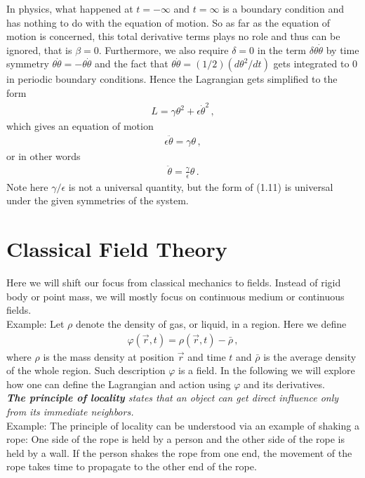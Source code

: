\documentclass[11pt, onesided]{book}
\theoremstyle{break}
\theoremstyle{break}
\newcommand{\example}{\color{green}Example: \color{black}}
\begin{document}
In physics, what happened at $t = -\infty$ and $t = \infty$ is a boundary condition and has nothing to do with the equation of motion. So as far as the equation of motion is concerned, this total derivative terms plays no role and thus can be ignored, that is $\beta =0$. Furthermore, we also require $\delta = 0$ in the term $\delta \theta \dot{\theta}$ by time symmetry $\theta \dot{\theta} = -\theta \dot{\theta}$ and the fact that $\theta \dot{\theta} = (1/2)(d\theta^2/dt)$ gets integrated to $0$ in periodic boundary conditions. Hence the Lagrangian gets simplified to the form
\begin{align*}
L = \gamma\theta^2 + \epsilon\dot{\theta}^2\,,
\end{align*}
which gives an equation of motion
\begin{align*}
\epsilon \ddot{\theta} = \gamma\theta\,,
\end{align*}
or in other words
\begin{align}
\ddot{\theta} = \frac{\gamma}{\epsilon}\theta\,.
\end{align}
Note here $\gamma/\epsilon$ is not a universal quantity, but the form of (1.11) is universal under the given symmetries of the system.

\newpage
\chapter{Classical Field Theory}
Here we will shift our focus from classical mechanics to fields. Instead of rigid body or point mass, we will mostly focus on
continuous medium or continuous fields.\\

\example Let $\rho$ denote the density of gas, or liquid, in a region. Here we define
\begin{align*}
\varphi(\vec{r}, t) = \rho(\vec{r} , t) - \bar{\rho}\,,
\end{align*}
where $\rho$ is the mass density at position $\vec{r}$ and time $t$ and $\bar{\rho}$ is the average density of the whole region. Such description $\varphi$ is a field. In the following we will explore how one can define the Lagrangian and action using $\varphi$ and its derivatives.\\

\textit{\textbf{The principle of locality} states that an object can get direct influence only from its immediate neighbors.}\\

\example The principle of locality can be understood via an example of shaking a rope: One side of the rope is held by a person and the other side of the rope is held by a wall. If the person shakes the rope from one end, the movement of the rope takes time to propagate to the other end of the rope. \\
\end{document}
